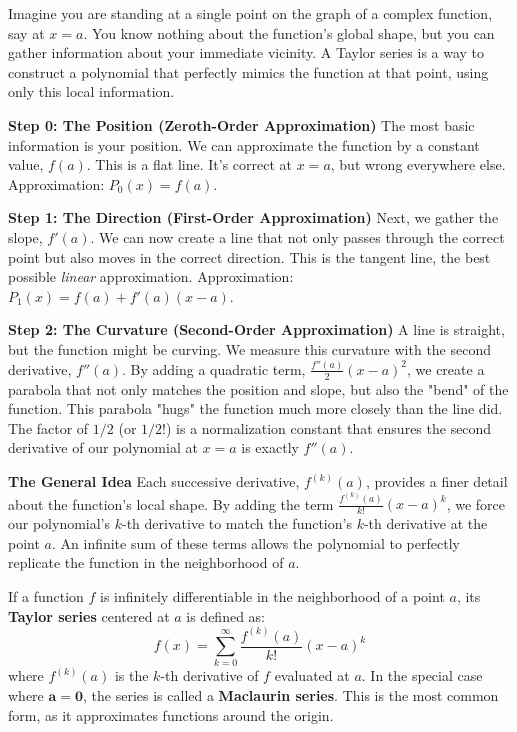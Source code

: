 \begin{intuitionbox}
Imagine you are standing at a single point on the graph of a complex function, say at $x=a$. You know nothing about the function's global shape, but you can gather information about your immediate vicinity. A Taylor series is a way to construct a polynomial that perfectly mimics the function at that point, using only this local information.

\textbf{Step 0: The Position (Zeroth-Order Approximation)}
\newline
The most basic information is your position. We can approximate the function by a constant value, $f(a)$. This is a flat line. It's correct at $x=a$, but wrong everywhere else.
\newline
Approximation: $P_0(x) = f(a)$.

\textbf{Step 1: The Direction (First-Order Approximation)}
\newline
Next, we gather the slope, $f'(a)$. We can now create a line that not only passes through the correct point but also moves in the correct direction. This is the tangent line, the best possible \textit{linear} approximation.
\newline
Approximation: $P_1(x) = f(a) + f'(a)(x-a)$.

\textbf{Step 2: The Curvature (Second-Order Approximation)}
\newline
A line is straight, but the function might be curving. We measure this curvature with the second derivative, $f''(a)$. By adding a quadratic term, $\frac{f''(a)}{2}(x-a)^2$, we create a parabola that not only matches the position and slope, but also the "bend" of the function. This parabola "hugs" the function much more closely than the line did. The factor of $1/2$ (or $1/2!$) is a normalization constant that ensures the second derivative of our polynomial at $x=a$ is exactly $f''(a)$.

\textbf{The General Idea}
\newline
Each successive derivative, $f^{(k)}(a)$, provides a finer detail about the function's local shape. By adding the term $\frac{f^{(k)}(a)}{k!}(x-a)^k$, we force our polynomial's $k$-th derivative to match the function's $k$-th derivative at the point $a$. An infinite sum of these terms allows the polynomial to perfectly replicate the function in the neighborhood of $a$.
\end{intuitionbox}


\begin{definitionbox}
If a function $f$ is infinitely differentiable in the neighborhood of a point $a$, its \textbf{Taylor series} centered at $a$ is defined as:
$$ f(x) = \sum_{k=0}^{\infty} \frac{f^{(k)}(a)}{k!} (x-a)^k $$
where $f^{(k)}(a)$ is the $k$-th derivative of $f$ evaluated at $a$.
\newline
\newline
In the special case where $\mathbf{a=0}$, the series is called a \textbf{Maclaurin series}. This is the most common form, as it approximates functions around the origin.
\end{definitionbox}



